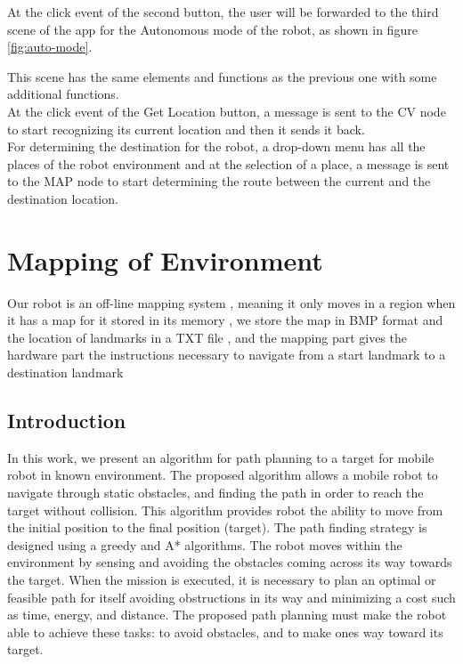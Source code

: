 \documentclass[12pt]{book}
\begin{document}
\noindent At the click event of the second button, the user will be forwarded to the third scene of the app for the
Autonomous mode of the robot, as shown in figure \ref{fig:auto-mode}.

This scene has the same elements and functions as the previous one with some additional functions.\\

\noindent At the click event of the Get Location button, a message is sent to the CV node to start recognizing its current location and then it sends it back.\\

\noindent For determining the destination for the robot, a drop-down menu has all the places of the robot environment and at the selection of a place, a message is sent to the MAP node to start determining the route between the current and the destination location.








\chapter{Mapping of Environment}
Our robot is an off-line mapping system , meaning it only moves in a region when it has a map for it stored in its memory , we store the map in BMP format and the location of landmarks in a TXT file , and the mapping part gives the hardware part the instructions necessary to navigate from a start landmark to a destination landmark

\section{Introduction}
In this work, we present an algorithm for path planning to a target for mobile robot in known environment. The proposed algorithm allows a mobile robot to navigate through static obstacles, and finding the path in order to reach the target without collision. This algorithm provides robot the ability to move from the initial position to the final position (target). The path finding strategy is designed using a greedy and A* algorithms. The robot moves within the environment by sensing and avoiding the obstacles coming across its way towards the target. When the mission is executed, it is necessary to plan an optimal or feasible path for itself avoiding obstructions in its way and minimizing a cost such as time, energy, and distance. The proposed path planning must make the robot able to achieve these tasks: to avoid obstacles, and to make ones way toward its target. 
\end{document}
